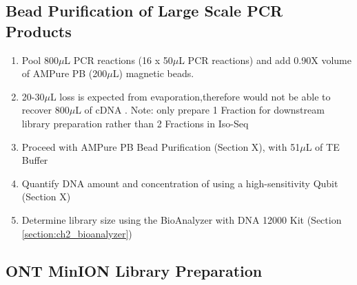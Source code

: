 \subsection{Bead Purification of Large Scale PCR Products}
\label{ONT_Protocol_Bead_Purification}
\begin{enumerate}
	\item Pool 800$\mu$L PCR reactions (16 x 50$\mu$L PCR reactions) and add 0.90X volume of AMPure PB (200$\mu$L) magnetic beads. 
	\item 20-30$\mu$L loss is expected from evaporation,therefore would not be able to recover 800$\mu$L of cDNA . Note: only prepare 1 Fraction for downstream library preparation rather than 2 Fractions in Iso-Seq
	\item Proceed with AMPure PB Bead Purification (Section X), with 51$\mu$L of TE Buffer
	\item Quantify DNA amount and concentration of using a high-sensitivity Qubit (Section X) 
	\item Determine library size using the BioAnalyzer with DNA 12000 Kit (Section \ref{section:ch2_bioanalyzer}) 
\end{enumerate}

\subsection{ONT MinION Library Preparation}
